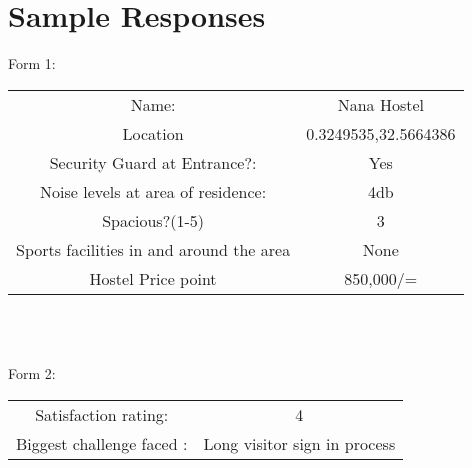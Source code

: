 \chapter{Sample Responses}

Form 1:\\
\begin{tabular}{c | c}
        Name: & Nana Hostel \\
        Location & 0.3249535,32.5664386 \\
        Security Guard at Entrance?: & Yes \\
        Noise levels at area of residence: & 4db \\
        Spacious?(1-5) & 3 \\
        Sports facilities in and around the area & None \\
        Hostel Price point & 850,000/= \\
\end{tabular}

\\
\\
\vspace{20mm}
    
Form 2:\\
\begin{tabular}{c | c}
        Satisfaction rating: & 4 \\
        Biggest challenge faced : & Long visitor sign in process
\end{tabular}